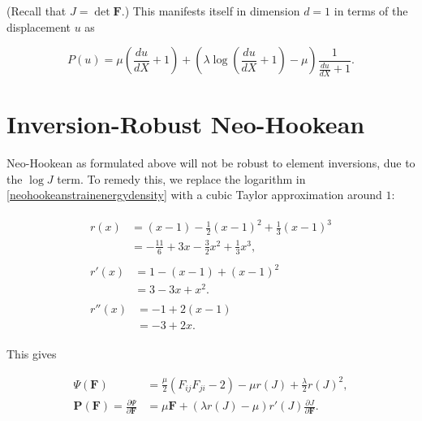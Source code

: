 \documentclass{article}
\begin{document}
(Recall that \(J = \det \mathbf{F}\).)  This manifests itself in dimension \(d = 1\) in terms of the displacement \(u\) as

\begin{equation}
P(u) = \mu \left( \frac{du}{dX} + 1 \right) + \left( \lambda \log \left( \frac{du}{dX} + 1 \right) - \mu \right) \frac{1}{\frac{du}{dX} + 1}.
\end{equation}

\section{Inversion-Robust Neo-Hookean}

Neo-Hookean as formulated above will not be robust to element inversions, due to the \(\log J\) term.  To remedy this, we replace the logarithm in \eqref{neohookeanstrainenergydensity} with a cubic Taylor approximation around \(1\):

\begin{subequations}\label{r}
\begin{align}
\begin{split}
r(x) & = (x - 1) - \frac{1}{2} (x - 1)^2 + \frac{1}{3} (x - 1)^3 \\
     & = -\frac{11}{6} + 3 x - \frac{3}{2} x^2 + \frac{1}{3} x^3,
\end{split} \\
\begin{split}
r'(x) & = 1 - (x - 1) + (x - 1)^2 \\
      & = 3 - 3 x + x^2.
\end{split} \\
\begin{split}
r''(x) & = -1 + 2 (x - 1) \\
       & = -3 + 2 x.
\end{split}
\end{align}
\end{subequations}

This gives

\begin{subequations}
\begin{align}
\Psi(\mathbf{F}) & = \frac{\mu}{2} \left( F_{ij} F_{ji} - 2 \right) - \mu r(J) + \frac{\lambda}{2} r(J)^2, \\ \mathbf{P}(\mathbf{F}) = \frac{\partial \Psi}{\partial \mathbf{F}} & = \mu \mathbf{F} + \left( \lambda r(J) - \mu \right) r'(J) \frac{\partial J}{\partial \mathbf{F}}.
\end{align}
\end{subequations}
\end{document}
